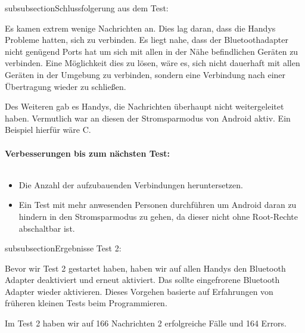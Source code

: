 subsubsection{Schlussfolgerung aus dem
Test:}\label{schlussfolgerung-aus-dem-test}

Es kamen extrem wenige Nachrichten an. Dies lag daran, dass die Handys
Probleme hatten, sich zu verbinden. Es liegt nahe, dass der
Bluetoothadapter nicht genügend Ports hat um sich mit allen in der Nähe
befindlichen Geräten zu verbinden. Eine Möglichkeit dies zu lösen, wäre
es, sich nicht dauerhaft mit allen Geräten in der Umgebung zu verbinden,
sondern eine Verbindung nach einer Übertragung wieder zu schließen.

Des Weiteren gab es Handys, die Nachrichten überhaupt nicht
weitergeleitet haben. Vermutlich war an diesen der Stromsparmodus von
Android aktiv. Ein Beispiel hierfür wäre C.
\\\\
\textbf{Verbesserungen bis zum nächsten Test:}
\\\\
\begin{itemize}
\tightlist
\item
  Die Anzahl der aufzubauenden Verbindungen heruntersetzen.
\item
  Ein Test mit mehr anwesenden Personen durchführen um Android daran zu
  hindern in den Stromsparmodus zu gehen, da dieser nicht ohne
  Root-Rechte abschaltbar ist.
\end{itemize}

subsubsection{Ergebnisse Test 2:}\label{ergebnisse-test-2}

Bevor wir Test 2 gestartet haben, haben wir auf allen Handys den
Bluetooth Adapter deaktiviert und erneut aktiviert. Das sollte
eingefrorene Bluetooth Adapter wieder aktivieren. Dieses Vorgehen
basierte auf Erfahrungen von früheren kleinen Tests beim Programmieren.

Im Test 2 haben wir auf 166 Nachrichten 2 erfolgreiche Fälle und 164
Errors.

